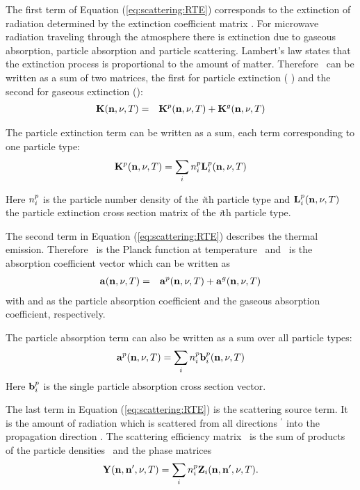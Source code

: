 \vspace{1ex}
The first term of Equation (\ref{eq:scattering:RTE}) corresponds to the extinction of
radiation determined by the extinction coefficient matrix \ExtMat
. For microwave radiation traveling through the atmosphere there is
extinction due to gaseous
absorption, particle absorption and  particle scattering. Lambert's law
states that the extinction process is
proportional to the amount of matter. Therefore
\ExtMat\ can be written as
a sum of two matrices, the first for particle extinction ( )
and the second for gaseous extinction ():
\begin{eqnarray}
  {\bf K}({\bf n}, \nu, T) &=&
  {\bf K}^{p}({\bf n}, \nu, T)+{\bf K}^{g}({\bf n}, \nu, T)
\end{eqnarray}

The particle extinction term can be written as a sum, each term
corresponding to one particle type:
\begin{eqnarray}
  {\bf K}^{p}({\bf n}, \nu, T) = \sum_i n^p_i {\bf L}^{p}_i ({\bf n}, \nu, T)
\end{eqnarray}

Here $n^p_i$ is the particle number density of the
{\sl i}th particle type and  ${\bf L}^{p}_i({\bf n}, \nu, T)$  the particle
extinction cross section matrix of the
{\sl i}th particle type.

The second term in Equation (\ref{eq:scattering:RTE})  describes the thermal
emission. Therefore \Planck\  is the Planck
function at temperature \Tmp\ and \AbsVec\  is the absorption
coefficient vector which can be written as
 \begin{eqnarray}
  {\bf a} ({\bf n}, \nu, T)  &=& {\bf a}^{p} ({\bf n}, \nu, T) + {\bf a}^{g} ({\bf n}, \nu, T) 
  \end{eqnarray}
with  and  as the particle
absorption 
coefficient
and the gaseous absorption coefficient, respectively. 

The particle absorption term can also be written as a sum over all
particle types:
\begin{eqnarray}
  {\bf a}^{p}({\bf n}, \nu, T) = \sum_i n^p_i {\bf b}^{p}_i ({\bf n}, \nu, T)
\end{eqnarray}
Here ${\bf b}^{p}_i$ is the single particle absorption cross section
vector. 

The last term in Equation (\ref{eq:scattering:RTE}) is the scattering source
term. It is the 
amount of radiation which is scattered from all directions \PDir$^\prime$   
into the propagation direction \PDir.  The scattering efficiency matrix
\SEfMat\ is the sum of products  
of the particle densities \PDen\  and the phase matrices \PhaMat
\begin{eqnarray}
{\bf Y}({\bf n}, {\bf n}', \nu, T) = \sum_i{n^p_i{\bf Z}_i({\bf n},
  {\bf n}', \nu, T)}.
\end{eqnarray}

